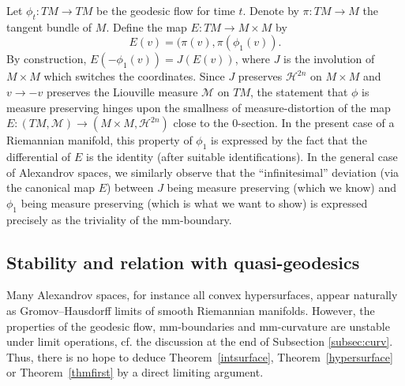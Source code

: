 \documentclass[12pt,leqno]{amsart}
\numberwithin{equation}{section}
\theoremstyle{definition}
\theoremstyle{remark}
\newcommand{\tref}[1]{Theorem~\ref{#1}}
\def\:{\colon}
\begin{document}
Let  $\phi_t\: TM\to TM$ be the geodesic flow for time $t$.
Denote by $\pi\: TM\to M$ the tangent bundle of $M$. Define the map $E\:TM\to M\times M$  by
\[E(v)=(\pi(v), \pi (\phi _1 (v)).\]
By construction, $E(-\phi_1(v))= J(E(v))$,
where $J$ is the involution of $M\times M$ which switches the coordinates.
Since $J$ preserves $\mathcal H^{2n}$ on $M\times M$ and $v\to -v$ preserves the Liouville measure $\mathcal M$ on $TM$,
the statement that $\phi$ is measure preserving hinges upon the smallness of measure-distortion of the map $E \:(TM,\mathcal M) \to (M\times M, \mathcal H^{2n})$ close to the $0$-section.
In the present case of a Riemannian manifold,
this property of $\phi_1$ is expressed by  the fact that the differential of $E$ is the identity (after suitable identifications).
In the general case of Alexandrov spaces, we similarly observe that the ``infinitesimal'' deviation (via the canonical map $E$) between $J$ being measure preserving (which we know) and  $\phi _1$ being measure preserving (which is what we want to show)
is expressed precisely as the triviality of  the mm-boundary.











\subsection{Stability and relation with quasi-geodesics}
Many Alexandrov spaces, for instance all convex hypersurfaces, appear naturally  as Gromov--Hausdorff limits of smooth Riemannian manifolds. However, the properties of the geodesic flow, mm-boundaries and mm-curvature are  unstable under limit operations, cf. the discussion at the end of Subsection \ref{subsec:curv}. Thus, there is no hope to deduce \tref{intsurface}, \tref{hypersurface} or \tref{thmfirst} by a direct limiting argument.
\end{document}
